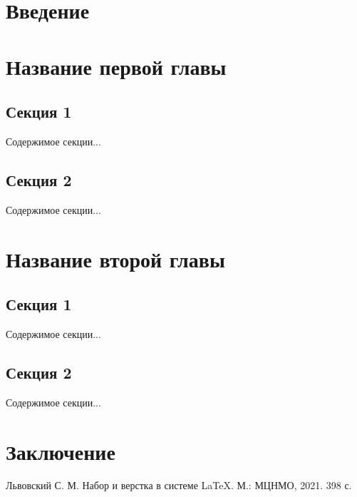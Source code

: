\documentclass[specialist,
substylefile = spbu.rtx,
               subf,href,colorlinks=true, 12pt]{disser}
\begin{document}
%
%
\date{\number\year}

\maketitle[en]

\def\thispagestyle#1{}
\tableofcontents

\chapter*{Введение}

\chapter{Название первой главы}

\section{Секция 1}

Содержимое секции...

\section{Секция 2}

Содержимое секции...

\chapter{Название второй главы}

\section{Секция 1}

Содержимое секции...

\section{Секция 2}

Содержимое секции...

\chapter*{Заключение}

\renewcommand{\bibname}{Список литературы}
\begin{thebibliography}{1}
	
	Львовский С. М. Набор и верстка в системе LaTeX. М.: МЦНМО, 2021. 398 с.
	
\end{thebibliography}
\end{document}
